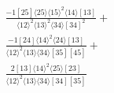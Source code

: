 \documentclass[varwidth, border=5pt]{standalone}
\begin{document}
\begin{my}
$\begin{gathered}
\scriptscriptstyle\frac{-1[25]⟨25⟩⟨15⟩^2⟨14⟩[13]}{⟨12⟩^2⟨13⟩^2⟨34⟩[34]^2}+\\
\scriptscriptstyle\frac{-1[24]⟨14⟩^2⟨24⟩[13]}{⟨12⟩^2⟨13⟩⟨34⟩[35][45]}+\\
\scriptscriptstyle\frac{2[13]⟨14⟩^2⟨25⟩[23]}{⟨12⟩^2⟨13⟩⟨34⟩[34][35]}\phantom{+}
\end{gathered}$
\end{my}
\end{document}
